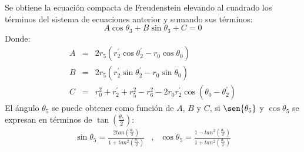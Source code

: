 Se obtiene la ecuación compacta de Freudenstein elevando al cuadrado los términos del sistema de ecuaciones anterior y sumando sus términos:
\begin{equation} \label{eq:griper_A1B1C1}
 A\cos{\theta_3}+B\sin{\theta_3}+C=0 
\end{equation}
Donde:
\begin{eqnarray}
A&=& 2r_5(r^{\prime}_2\cos{\theta^{\prime}_2}-r_0\cos{\theta_0}) \label{eq:griper_A} \\
B&=& 2r_5(r^{\prime}_2\sin{\theta^{\prime}_2}-r_0\sin{\theta_0}) \label{eq:griper_B} \\
C&=& r_0^2+r^{\prime}_2+r_5^2-r_6^2 -2r_0r^{\prime}_2\cos(\theta_0-\theta^{\prime}_2) \label{eq:griper_C}
\end{eqnarray}
El ángulo $\theta_5$ se puede obtener como función de $A$, $B$ y $C$, si $\sen{\theta_5}$ y $\cos{\theta_5}$  se expresan en términos de $\tan(\frac{\theta_5}{2})$:
\begin{eqnarray}
\sin{\theta_5}= \frac{2tan(\frac{\theta_5}{2})}{1+tan^2(\frac{\theta_5}{2})}&,& \cos{\theta_5}= \frac{1-tan^2(\frac{\theta_5}{2})}{1+tan^2(\frac{\theta_5}{2})} \label{eq:griper_enFuncionTheta3}
\end{eqnarray}

